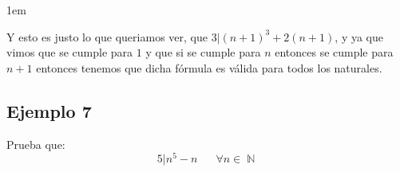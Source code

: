 \documentclass[12pt, fleqn]{report}                             %
\newenvironment{SmallIndentation}[1][0.75em]                    %
        {\begin{adjustwidth}{#1}{}\begin{footnotesize}}             %
        {\end{footnotesize}\end{adjustwidth}}                       %
\DeclareMathOperator \Space     {\quad}                         %
\theoremstyle{break}                                            %
\DeclareMathOperator \Naturals     {\mathbb{N}}                 %
\begin{document}
\begin{SmallIndentation}[1em]
\begin{itemize}
                        Y esto es justo lo que queriamos ver, que $3 | (n+1)^3 + 2(n+1)$, y ya que vimos que se cumple
                        para $1$ y que si se cumple para $n$ entonces se cumple para $n+1$ entonces
                        tenemos que dicha fórmula es válida para todos los naturales.
                        
                    \end{itemize}

                \end{SmallIndentation}


            \clearpage
            \subsection*{Ejemplo 7}

                Prueba que:
                \begin{equation*}
                    5 | n^5 - n
                    \Space \forall n \in \Naturals 
                \end{equation*}
\end{document}
